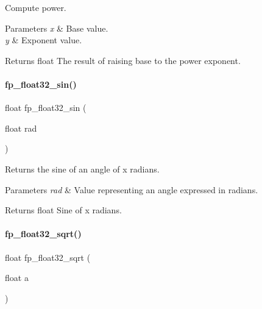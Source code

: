 Compute power. 


\begin{DoxyParams}{Parameters}
{\em x} & Base value. \\
\hline
{\em y} & Exponent value. \\
\hline
\end{DoxyParams}
\begin{DoxyReturn}{Returns}
float The result of raising base to the power exponent. 
\end{DoxyReturn}
\mbox{\label{a00023_ae57383891f734bc754b6ade61fed3677}} 
\paragraph{\texorpdfstring{fp\+\_\+float32\+\_\+sin()}{fp\_float32\_sin()}}
{\footnotesize\ttfamily float fp\+\_\+float32\+\_\+sin (\begin{DoxyParamCaption}\item[{float}]{rad }\end{DoxyParamCaption})}



Returns the sine of an angle of x radians. 


\begin{DoxyParams}{Parameters}
{\em rad} & Value representing an angle expressed in radians. \\
\hline
\end{DoxyParams}
\begin{DoxyReturn}{Returns}
float Sine of x radians. 
\end{DoxyReturn}
\mbox{\label{a00023_a310b7eb83e737130e48a8d4b0853efd5}} 
\paragraph{\texorpdfstring{fp\+\_\+float32\+\_\+sqrt()}{fp\_float32\_sqrt()}}
{\footnotesize\ttfamily float fp\+\_\+float32\+\_\+sqrt (\begin{DoxyParamCaption}\item[{float}]{a }\end{DoxyParamCaption})}



